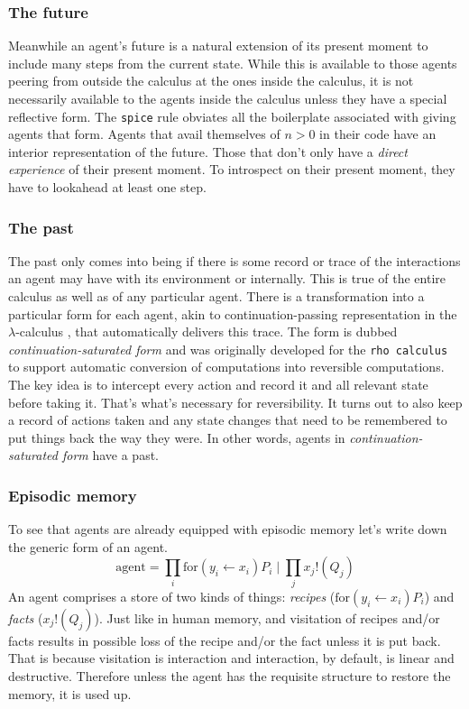 \documentclass{article}
\newcommand{\msgsend}[2]{#1!(#2)}
\newcommand{\msgrecv}[3]{\text{for}(#2 \leftarrow #1) #3}
\newcommand{\parcomp}{\mid}
\newcommand{\code}[1]{\texttt{#1}}
\begin{document}
\subsubsection{The future}

Meanwhile an agent's future is a natural extension of its present moment to include many steps from the current state. While this is available to those agents peering from outside the calculus at the ones inside the calculus, it is not necessarily available to the agents inside the calculus unless they have a special reflective form. The \code{spice} rule obviates all the boilerplate associated with giving agents that form. Agents that avail themselves of $n > 0$ in their code have an interior representation of the future. Those that don't only have a \emph{direct experience} of their present moment. To introspect on their present moment, they have to lookahead at least one step.

\subsubsection{The past}

The past only comes into being if there is some record or trace of the interactions an agent may have with its environment or internally. This is true of the entire calculus as well as of any particular agent. There is a transformation into a particular form for each agent, akin to continuation-passing representation in the $\lambda$-calculus \cite{StracheyWadsworth1974}, that automatically delivers this trace. The form is dubbed \emph{continuation-saturated form} and was originally developed for the \code{rho calculus} to support automatic conversion of computations into reversible computations. The key idea is to intercept every action and record it and all relevant state before taking it. That's what's necessary for reversibility. It turns out to also keep a record of actions taken and any state changes that need to be remembered to put things back the way they were. In other words, agents in \emph{continuation-saturated form} have a past.

\subsubsection{Episodic memory}

To see that agents are already equipped with episodic memory let's write down the generic form of an agent.
\[
  \text{agent} = \prod_i \msgrecv{x_i}{y_i}{P_i} \parcomp \prod_j \msgsend{x_j}{Q_j}
\]
An agent comprises a store of two kinds of things: \emph{recipes} ($\msgrecv{x_i}{y_i}{P_i}$) and \emph{facts} ($\msgsend{x_j}{Q_j}$). Just like in human memory, and visitation of recipes and/or facts results in possible loss of the recipe and/or the fact unless it is put back. That is because visitation is interaction and interaction, by default, is linear and destructive. Therefore unless the agent has the requisite structure to restore the memory, it is used up.
\end{document}
